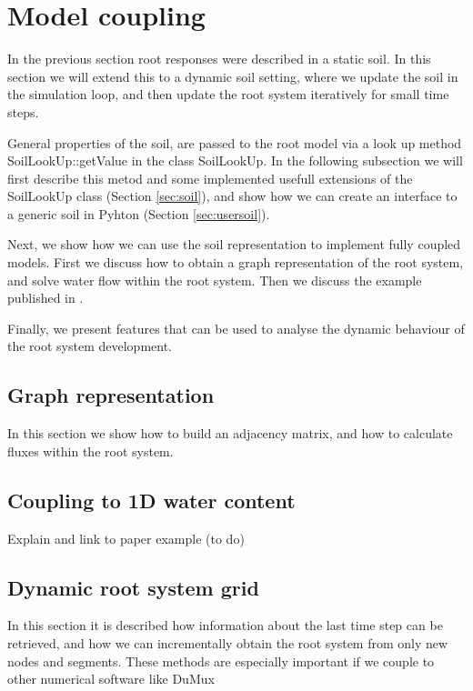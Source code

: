 \documentclass[a4paper]{article}
\begin{document}
\section{Model coupling}

In the previous section root responses were described in a static soil. 
In this section we will extend this to a dynamic soil setting, where we update the soil in the simulation loop, and then update the root system iteratively for small time steps. 

General properties of the soil, are passed to the root model via a look up method SoilLookUp::getValue in the class SoilLookUp. 
In the following subsection we will first describe this metod and some implemented usefull extensions of the SoilLookUp class (Section \ref{sec:soil}), 
and show how we can create an interface to a generic soil in Pyhton (Section \ref{sec:usersoil}). 

Next, we show how we can use the soil representation to implement fully coupled models. First we discuss how to obtain a graph representation of the root system, and solve water flow within the root system. 
Then we discuss the example published in \cite{}. 

Finally, we present features that can be used to analyse the dynamic behaviour of the root system development.


\subsection{Graph representation} \label{sec:graph} 

In this section we show how to build an adjacency matrix, and how to calculate fluxes within the root system.

% 

\subsection{Coupling to 1D water content} \label{sec:fullcoupling} 

Explain and link to paper example (to do)


\subsection{Dynamic root system grid} \label{sec:published}

In this section it is described how information about the last time step can be retrieved, 
and how we can incrementally obtain the root system from only new nodes and segments. 
These methods are especially important if we couple to other numerical software like DuMux

%



\end{document}
